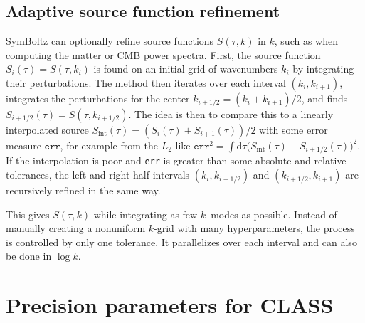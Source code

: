 \documentclass{aa}
\begin{document}
\subsection{Adaptive source function refinement}
\label{sec:adaptive}

SymBoltz can optionally refine source functions $S(\tau,k)$ in $k$, such as when computing the matter or CMB power spectra.
First, the source function $S_i(\tau) = S(\tau,k_i)$ is found on an initial grid of wavenumbers $k_i$ by integrating their perturbations.
The method then iterates over each interval $(k_i, k_{i+1})$, integrates the perturbations for the center $k_{i+1/2} = (k_i+k_{i+1})/2$, and finds $S_{i+1/2}(\tau) = S(\tau,k_{i+1/2})$.
The idea is then to compare this to a linearly interpolated source $S_\text{int}(\tau) = (S_i(\tau) + S_{i+1}(\tau)) / 2$ with some error measure $\texttt{err}$, for example from the $L_2$-like $\texttt{err}^2 = \int \mathrm{d}\tau \big( S_\text{int}(\tau) - S_{i+1/2}(\tau) \big)^2$.
If the interpolation is poor and \texttt{err} is greater than some absolute and relative tolerances, the left and right half-intervals $(k_i,k_{i+1/2})$ and $(k_{i+1/2},k_{i+1})$ are recursively refined in the same way.

This gives $S(\tau,k)$ while integrating as few $k$–modes as possible.
Instead of manually creating a nonuniform $k$-grid with many hyperparameters, the process is controlled by only one tolerance.
It parallelizes over each interval and can also be done in $\log k$.

\section{Precision parameters for CLASS}
\label{sec:precision}
\end{document}
